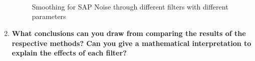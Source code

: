 \documentclass{article}
\begin{document}
\begin{enumerate}
\begin{figure}[H]
    \centering
    \\
    \\
    \\
    \caption{Smoothing for SAP Noise through different filters with different parameters}
    \label{figSAPN}
\end{figure}

\item \textbf{What conclusions can you draw from comparing the results of the respective methods? Can you give a mathematical interpretation to explain the effects of each filter?}


\end{enumerate}
\end{document}
